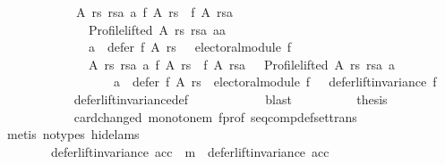 \begin{isabellebody}
\ \ \ \ \ \ \ \ \ \ \ \ {\isacharparenleft}{\kern0pt}{\isasymexists}A\ rs\ rsa\ a{\isachardot}{\kern0pt}\ f\ A\ rs\ {\isasymnoteq}\ f\ A\ rsa\ {\isasymand}\isanewline
\ \ \ \ \ \ \ \ \ \ \ \ \ \ Profile{\isachardot}{\kern0pt}lifted\ A\ rs\ rsa\ {\isacharparenleft}{\kern0pt}a{\isacharcolon}{\kern0pt}{\isacharcolon}{\kern0pt}{\isacharprime}{\kern0pt}a{\isacharparenright}{\kern0pt}\ {\isasymand}\isanewline
\ \ \ \ \ \ \ \ \ \ \ \ \ \ a\ {\isasymin}\ defer\ f\ A\ rs{\isacharparenright}{\kern0pt}\ {\isasymor}\ {\isasymnot}\ electoral{\isacharunderscore}{\kern0pt}module\ f{\isacharparenright}{\kern0pt}\ {\isasymand}\isanewline
\ \ \ \ \ \ \ \ \ \ \ \ \ \ {\isacharparenleft}{\kern0pt}{\isacharparenleft}{\kern0pt}{\isasymforall}A\ rs\ rsa\ a{\isachardot}{\kern0pt}\ f\ A\ rs\ {\isacharequal}{\kern0pt}\ f\ A\ rsa\ {\isasymor}\ {\isasymnot}\ Profile{\isachardot}{\kern0pt}lifted\ A\ rs\ rsa\ a\ {\isasymor}\isanewline
\ \ \ \ \ \ \ \ \ \ \ \ \ \ \ \ \ \ a\ {\isasymnotin}\ defer\ f\ A\ rs{\isacharparenright}{\kern0pt}\ {\isasymand}\ electoral{\isacharunderscore}{\kern0pt}module\ f\ {\isasymor}\ {\isasymnot}\ defer{\isacharunderscore}{\kern0pt}lift{\isacharunderscore}{\kern0pt}invariance\ f{\isacharparenright}{\kern0pt}{\isachardoublequoteclose}\isanewline
\ \ \ \ \ \ \ \ \ \ \isamarkupfalse%
\ defer{\isacharunderscore}{\kern0pt}lift{\isacharunderscore}{\kern0pt}invariance{\isacharunderscore}{\kern0pt}def\isanewline
\ \ \ \ \ \ \ \ \ \ \isamarkupfalse%
\ blast\isanewline
\ \ \ \ \ \ \ \ \isamarkupfalse%
\ {\isacharquery}{\kern0pt}thesis\isanewline
\ \ \ \ \ \ \ \ \ \ \isamarkupfalse%
\ card{\isacharunderscore}{\kern0pt}changed\ monotone{\isacharunderscore}{\kern0pt}m\ f{\isacharunderscore}{\kern0pt}prof\ seq{\isacharunderscore}{\kern0pt}comp{\isacharunderscore}{\kern0pt}def{\isacharunderscore}{\kern0pt}set{\isacharunderscore}{\kern0pt}trans\isanewline
\ \ \ \ \ \ \ \ \ \ \isamarkupfalse%
\ {\isacharparenleft}{\kern0pt}metis\ {\isacharparenleft}{\kern0pt}no{\isacharunderscore}{\kern0pt}types{\isacharcomma}{\kern0pt}\ hide{\isacharunderscore}{\kern0pt}lams{\isacharparenright}{\kern0pt}{\isacharparenright}{\kern0pt}\isanewline
\ \ \ \ \ \ \isamarkupfalse%
\isanewline
\ \ \ \ \ \ \isamarkupfalse%
\isanewline
\ \ \ \ \ \ \ \ {\isachardoublequoteopen}defer{\isacharunderscore}{\kern0pt}lift{\isacharunderscore}{\kern0pt}invariance\ {\isacharparenleft}{\kern0pt}acc\ {\isasymtriangleright}\ m{\isacharparenright}{\kern0pt}\ {\isasymand}\ defer{\isacharunderscore}{\kern0pt}lift{\isacharunderscore}{\kern0pt}invariance\ {\isacharparenleft}{\kern0pt}acc{\isacharparenright}{\kern0pt}\ {\isasymlongrightarrow}\isanewline

\end{isabellebody}
